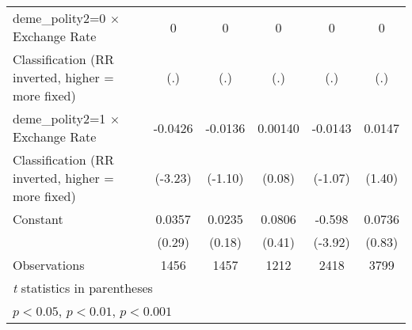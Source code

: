 \begin{table}[htbp]
\begin{tabular}{l*{5}{c}}
\addlinespace
deme\_polity2=0 $\times$ Exchange Rate   &        0         &        0         &        0         &        0         &        0         \\
Classification (RR inverted, higher = more fixed)&      (.)         &      (.)         &      (.)         &      (.)         &      (.)         \\
\addlinespace
deme\_polity2=1 $\times$ Exchange Rate   &  -0.0426\sym{**} &  -0.0136         &  0.00140         &  -0.0143         &   0.0147         \\
Classification (RR inverted, higher = more fixed)&  (-3.23)         &  (-1.10)         &   (0.08)         &  (-1.07)         &   (1.40)         \\
\addlinespace
Constant                                &   0.0357         &   0.0235         &   0.0806         &   -0.598\sym{***}&   0.0736         \\
                                        &   (0.29)         &   (0.18)         &   (0.41)         &  (-3.92)         &   (0.83)         \\
\midrule
Observations                            &     1456         &     1457         &     1212         &     2418         &     3799         \\
\bottomrule
\multicolumn{6}{l}{\footnotesize \textit{t} statistics in parentheses}\\
\multicolumn{6}{l}{\footnotesize \sym{*} \(p<0.05\), \sym{**} \(p<0.01\), \sym{***} \(p<0.001\)}\\
\end{tabular}
\end{table}
